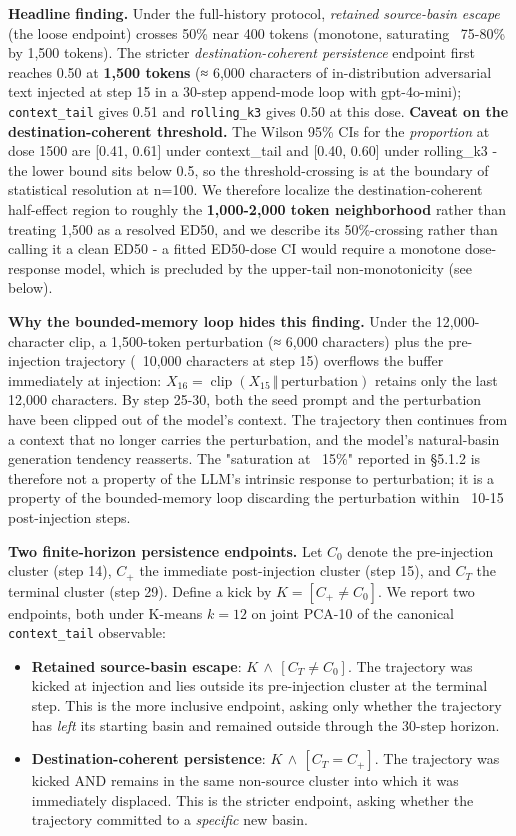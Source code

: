 \documentclass{article}
\theoremstyle{plain}
\theoremstyle{definition}
\begin{document}
\textbf{Headline finding.} Under the full-history protocol, \textit{retained source-basin escape} (the loose endpoint) crosses 50\% near 400 tokens (monotone, saturating ~75-80\% by 1,500 tokens). The stricter \textit{destination-coherent persistence} endpoint first reaches 0.50 at \textbf{1,500 tokens} (≈ 6,000 characters of in-distribution adversarial text injected at step 15 in a 30-step append-mode loop with gpt-4o-mini); \texttt{context\_tail} gives 0.51 and \texttt{rolling\_k3} gives 0.50 at this dose. \textbf{Caveat on the destination-coherent threshold.} The Wilson 95\% CIs for the \textit{proportion} at dose 1500 are [0.41, 0.61] under context\_tail and [0.40, 0.60] under rolling\_k3 - the lower bound sits below 0.5, so the threshold-crossing is at the boundary of statistical resolution at n=100. We therefore localize the destination-coherent half-effect region to roughly the \textbf{1,000-2,000 token neighborhood} rather than treating 1,500 as a resolved ED50, and we describe its 50\%-crossing rather than calling it a clean ED50 - a fitted ED50-dose CI would require a monotone dose-response model, which is precluded by the upper-tail non-monotonicity (see below).

\textbf{Why the bounded-memory loop hides this finding.} Under the 12,000-character clip, a 1,500-token perturbation (≈ 6,000 characters) plus the pre-injection trajectory (~10,000 characters at step 15) overflows the buffer immediately at injection: $X_{16} = \operatorname{clip}(X_{15} \,\Vert\, \text{perturbation})$ retains only the last 12,000 characters. By step 25-30, both the seed prompt and the perturbation have been clipped out of the model's context. The trajectory then continues from a context that no longer carries the perturbation, and the model's natural-basin generation tendency reasserts. The "saturation at ~15\%" reported in §5.1.2 is therefore not a property of the LLM's intrinsic response to perturbation; it is a property of the bounded-memory loop discarding the perturbation within ~10-15 post-injection steps.

\textbf{Two finite-horizon persistence endpoints.} Let \(C_0\) denote the pre-injection cluster (step 14), \(C_+\) the immediate post-injection cluster (step 15), and \(C_T\) the terminal cluster (step 29). Define a kick by \(K=[C_+\neq C_0]\). We report two endpoints, both under K-means \(k=12\) on joint PCA-10 of the canonical \texttt{context\_tail} observable:

\begin{itemize}
  \item \textbf{Retained source-basin escape}: \(K\,\wedge\,[C_T\neq C_0]\). The trajectory was kicked at injection and lies outside its pre-injection cluster at the terminal step. This is the more inclusive endpoint, asking only whether the trajectory has \textit{left} its starting basin and remained outside through the 30-step horizon.
  \item \textbf{Destination-coherent persistence}: \(K\,\wedge\,[C_T=C_+]\). The trajectory was kicked AND remains in the same non-source cluster into which it was immediately displaced. This is the stricter endpoint, asking whether the trajectory committed to a \textit{specific} new basin.
\end{itemize}
\end{document}
